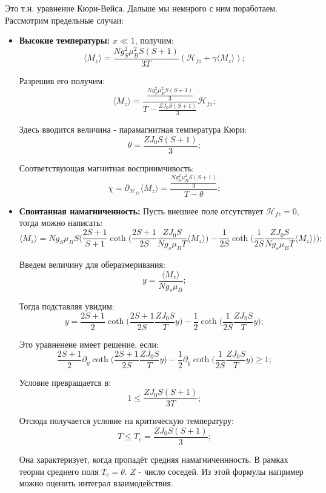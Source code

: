 \documentclass[a4paper, 14pt, russian]{article}
\newcommand{\be}{\begin{equation}}
\newcommand{\ee}{\end{equation}}
\newcommand{\pa}{\partial}
\begin{document}
	Это т.н. уравнение Кюри-Вейса. Дальше мы немнрого с ним поработаем. 
	Рассмотрим предельные случаи:
	\begin{itemize}
		\item \textbf{Высокие температуры:} $x \ll 1$, получим:
			\be
				\langle M_z \rangle = \frac{N g_S^2 \mu_B^2 S(S+1)}{3T} 
					(\mathcal{H}_{fz} + \gamma \langle M_z \rangle);
			\ee

			Разрешив его получим:
			\be
				\label{eq100}
				\langle M_z \rangle = \frac{\frac{N g_S^2 \mu_B^2 S(S+1)}{3}}
					{T - \frac{ZJ_0 S(S+1)}{3}} \mathcal{H}_{fz};
			\ee

			Здесь вводится величина - парамагнитная температура Кюри:
			\be
				\theta  = \frac{ZJ_0 S(S+1)}{3};
			\ee

			Соответствующая магнитная восприимчивость:
			\be
				\chi = \pa_{\mathcal{H}_{fz}} \langle M_z \rangle = 
					\frac{\frac{N g_S^2 \mu_B^2 S(S+1)}{3}}{T-\theta};
			\ee

		\item \textbf{Спонтанная намагниченность:} Пусть внешнее поле отсутствует
			$\mathcal{H}_{fz} = 0$, тогда можно написать:
			\be
				\label{eq101}
				\langle M_z \rangle = Ng_S \mu_B S \Big(\frac{2S+1}{S+1}
					\coth\big(\frac{2S+1}{2S} \frac{ZJ_0 S}{Ng_s\mu_B T} \langle M_z \rangle\big)
					-\frac{1}{2S}\coth\big(\frac{1}{2S} \frac{ZJ_0 S}{Ng_s\mu_B T} \langle M_z \rangle\big)\Big);
			\ee

			Введем величину для оберазмеривания:
			\be
				y = \frac{\langle M_z \rangle}{Ng_s \mu_B};
			\ee

			Тогда подставляя увидим:
			\be
				y = \frac{2S+1}{2} \coth\big(\frac{2S+1}{2S}\frac{ZJ_0S}{T} y \big) -
					\frac{1}{2} \coth\big(\frac{1}{2S} \frac{ZJ_0S}{T} y\big);
			\ee

			Это уравненеие имеет решение, если:
			\be
				\frac{2S+1}{2} \pa_y \coth\big(\frac{2S+1}{2S}\frac{ZJ_0S}{T} y \big) -
					\frac{1}{2} \pa_y \coth\big(\frac{1}{2S} \frac{ZJ_0S}{T} y\big) \ge 1;
			\ee

			Условие превращается в:
			\be
				1 \le \frac{ZJ_0 S(S+1)}{3T};
			\ee

			Отсюда получается условие на критическую температуру:
			\be
				\label{eq102}
				T \le T_c = \frac{ZJ_0 S(S+1)}{3};
			\ee

			Она характеризует, когда пропадёт средняя намагниченнность. В рамках 
			теории среднего поля $T_c = \theta$. $Z$  - число соседей. Из этой
			формулы например можно оценить интеграл взаимодействия.


\end{itemize}
\end{document}
